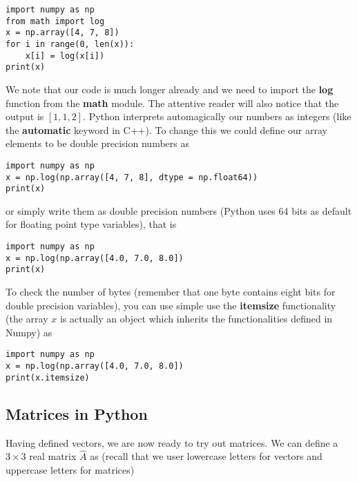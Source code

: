 \documentclass[%
oneside,                 %
final,                   %
10pt]{article}
\begin{document}
\begin{verbatim}
import numpy as np
from math import log
x = np.array([4, 7, 8])
for i in range(0, len(x)):
    x[i] = log(x[i])
print(x)
\end{verbatim}
We note that our code is much longer already and we need to import the \textbf{log} function from the \textbf{math} module. 
The attentive reader will also notice that the output is $[1, 1, 2]$. Python interprets automagically our numbers as integers (like the \textbf{automatic} keyword in C++). To change this we could define our array elements to be double precision numbers as
\begin{verbatim}
import numpy as np
x = np.log(np.array([4, 7, 8], dtype = np.float64))
print(x)
\end{verbatim}
or simply write them as double precision numbers (Python uses 64 bits as default for floating point type variables), that is
\begin{verbatim}
import numpy as np
x = np.log(np.array([4.0, 7.0, 8.0])
print(x)
\end{verbatim}
To check the number of bytes (remember that one byte contains eight bits for double precision variables), you can use simple use the \textbf{itemsize} functionality (the array $x$ is actually an object which inherits the functionalities defined in Numpy) as 
\begin{verbatim}
import numpy as np
x = np.log(np.array([4.0, 7.0, 8.0])
print(x.itemsize)
\end{verbatim}


\subsection*{Matrices in Python}

Having defined vectors, we are now ready to try out matrices. We can
define a $3 \times 3 $ real matrix $\hat{A}$ as (recall that we user
lowercase letters for vectors and uppercase letters for matrices)
\end{document}
